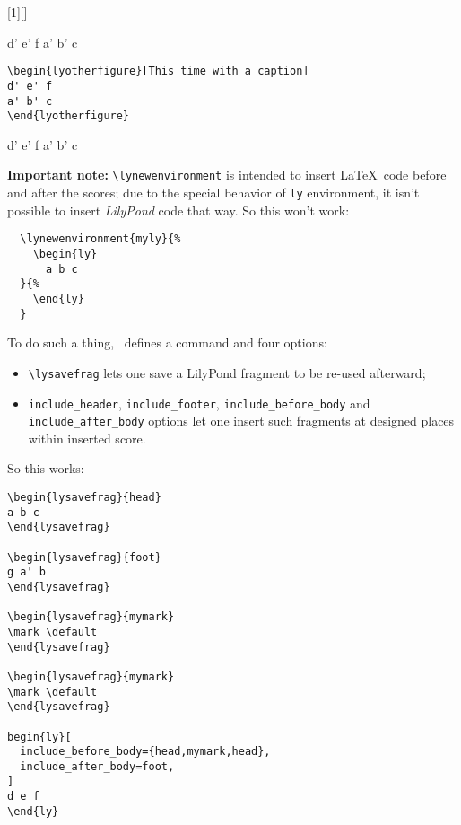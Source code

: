 \documentclass{lyluatexexample}
\begin{document}
[1][]{%
\edef\option{#1}
\figure
\center
  \ly
}{%
  \endly%
  \def\empty{}\ifx\option\empty\else\caption{\option}\fi
\endcenter
\endfigure
}

\begin{lyotherfigure}
d' e' f
a' b' c
\end{lyotherfigure}

\begin{verbatim}
\begin{lyotherfigure}[This time with a caption]
d' e' f
a' b' c
\end{lyotherfigure}
\end{verbatim}

\begin{lyotherfigure}
d' e' f
a' b' c
\end{lyotherfigure}

\textbf{Important note:} \verb`\lynewenvironment` is intended to insert \LaTeX\ code before
and after the scores; due to the special behavior of \verb`ly` environment, it isn't possible
to insert \emph{LilyPond} code that way. So this won't work:

\begin{verbatim}
  \lynewenvironment{myly}{%
    \begin{ly}
      a b c
  }{%
    \end{ly}
  }
\end{verbatim}

To do such a thing, \lyluatex\ defines a command and four options:
\begin{itemize}
  \item \verb`\lysavefrag` lets one save a LilyPond fragment to be re-used afterward;
  \item \verb`include_header`, \verb`include_footer`, \verb`include_before_body` and \verb`include_after_body` options
        let one insert such fragments at designed places within inserted score.
\end{itemize}

So this works:

\begin{verbatim}
\begin{lysavefrag}{head}
a b c
\end{lysavefrag}

\begin{lysavefrag}{foot}
g a' b
\end{lysavefrag}

\begin{lysavefrag}{mymark}
\mark \default
\end{lysavefrag}

\begin{lysavefrag}{mymark}
\mark \default
\end{lysavefrag}

begin{ly}[
  include_before_body={head,mymark,head},
  include_after_body=foot,
]
d e f
\end{ly}
\end{verbatim}
\end{document}
